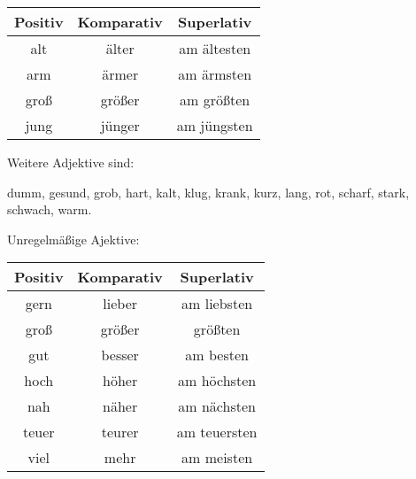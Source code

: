 \begin{tabular}{|c|c|c|}
\hline
Positiv & Komparativ & Superlativ \\
\hline
alt & \"alter & am \"altesten \\
arm & \"armer & am \"armsten \\
gro\ss & gr\"o\ss er & am gr\"o\ss ten \\
jung & j\"unger & am j\"ungsten \\
\hline
\end {tabular}

Weitere Adjektive sind:

dumm, gesund, grob, hart, kalt, klug, krank, kurz, lang, rot, scharf, stark, schwach, warm. 

Unregelm\"a\ss ige Ajektive:
\begin{longtable}{|c|c|c|}
\hline
Positiv & Komparativ & Superlativ \\
\hline\endhead
\hline\endfoot
gern & lieber & am liebsten \\
gro\ss & gr\"o\ss er & gr\"o\ss ten \\
gut & besser & am besten \\
hoch & h\"oher & am h\"ochsten \\
nah & n\"aher & am n\"achsten \\
teuer & teurer & am teuersten \\
viel & mehr & am meisten \\
\end{longtable}
